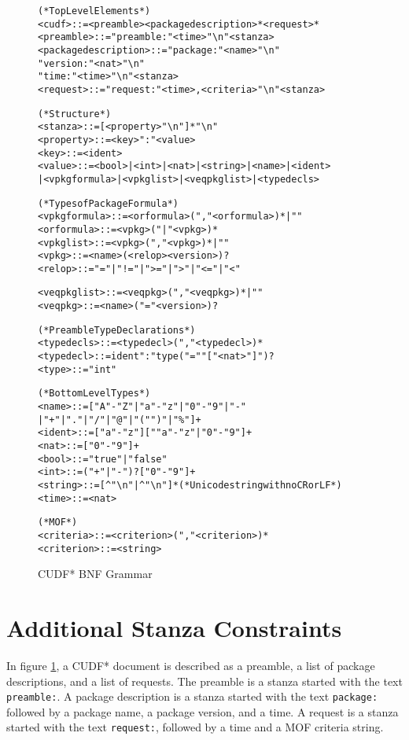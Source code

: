\begin{figure}[htp] 
\begin{center}
\begin{alltt}
(* Top Level Elements *)
<cudf> ::= <preamble> <packagedescription>* <request>*
<preamble> ::= "preamble:" <time> "\textbackslash{}n" <stanza>
<packagedescription> ::= "package:" <name> "\textbackslash{}n" \\    "version:" <nat> "\textbackslash{}n" \\    "time:" <time> "\textbackslash{}n" <stanza>
<request> ::= "request:" <time>, <criteria> "\textbackslash{}n" <stanza>

(* Structure *)
<stanza> ::= [<property> "\textbackslash{}n"]* "\textbackslash{}n"
<property> ::= <key> ":" <value>
<key> ::= <ident>
<value> ::= <bool> | <int> | <nat> | <string> | <name> | <ident> \\    | <vpkgformula> | <vpkglist> | <veqpkglist> | <typedecls>

(* Types of Package Formula *)
<vpkgformula> ::= <orformula> ("," <orformula>)* | ""
<orformula> ::= <vpkg> ("|" <vpkg>)*
<vpkglist> ::= <vpkg> ("," <vpkg>)* | ""
<vpkg> ::= <name> (<relop> <version>)?
<relop> ::= "=" | "!=" | ">=" | ">" | "<=" | "<"

<veqpkglist> ::= <veqpkg> ("," <veqpkg>)* | ""
<veqpkg> ::= <name> ("=" <version>)?

(* Preamble Type Declarations *)
<typedecls> ::= <typedecl> ("," <typedecl>)*
<typedecl> ::= ident ":" type ("=" "["<nat>"]")?
<type> ::= "int"

(* Bottom Level Types *)
<name> ::= ["A"-"Z" | "a"-"z" | "0"-"9" | "-" \\    | "+" | "." | "/" | "@" | "(" ")" | "\%"]+
<ident> ::= ["a"-"z"][""a"-"z" | "0"-"9"]+		
<nat> ::= ["0"-"9"]+
<bool> ::= "true" | "false"
<int> ::= ("+"|"-")? ["0"-"9"]+
<string> ::= [^"\textbackslash{}n"| ^"\textbackslash{}n"]* (*Unicode string with no CR or LF*)
<time> ::= <nat>

(* MOF *)
<criteria> ::= <criterion> ("," <criterion>)*
<criterion> ::= <string>
\end{alltt}
  \caption{CUDF* BNF Grammar}
  \label{formal.cudfBNFgrammar}
\end{center}
\end{figure}

\section{Additional Stanza Constraints}
In figure \ref{formal.cudfBNFgrammar}, a CUDF* document is described as a preamble, a list of package descriptions, and a list of requests.
The preamble is a stanza started with the text \verb+preamble:+.
A package description is a stanza started with the text \verb+package:+ followed by a package name, a package version, and a time.
A request is a stanza started with the text \verb+request:+, followed by a time and a MOF criteria string.

